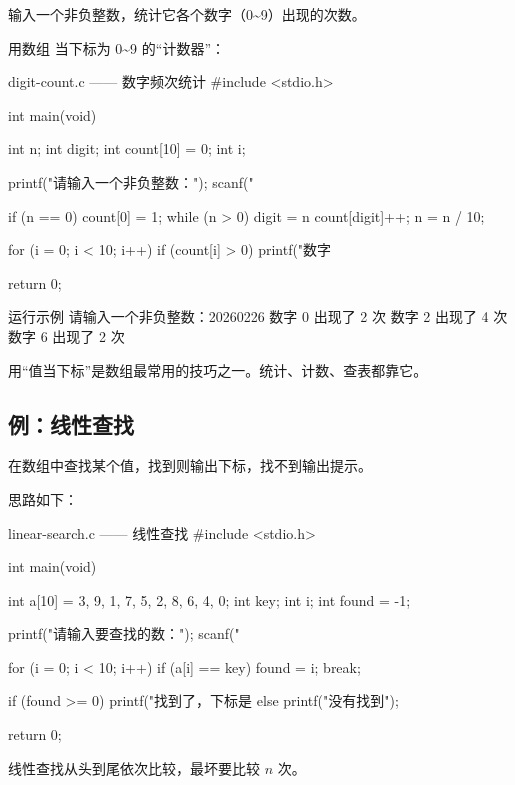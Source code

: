 \begin{example}
输入一个非负整数，统计它各个数字（0\textasciitilde9）出现的次数。
\end{example}
\begin{solution}
用数组  当下标为 0\textasciitilde9 的“计数器”：

\begin{codebox}{digit-count.c —— 数字频次统计}
#include <stdio.h>

int main(void)
{
    int n;
    int digit;
    int count[10] = {0};
    int i;

    printf("请输入一个非负整数：");
    scanf("%

    if (n == 0) {
        count[0] = 1;
    }
    while (n > 0) {
        digit = n %
        count[digit]++;
        n = n / 10;
    }

    for (i = 0; i < 10; i++) {
        if (count[i] > 0) {
            printf("数字 %
        }
    }

    return 0;
}
\end{codebox}

\begin{outbox}{运行示例}
请输入一个非负整数：20260226
数字 0 出现了 2 次
数字 2 出现了 4 次
数字 6 出现了 2 次
\end{outbox}

用“值当下标”是数组最常用的技巧之一。统计、计数、查表都靠它。
\end{solution}

\subsection{例：线性查找}

\begin{example}
在数组中查找某个值，找到则输出下标，找不到输出提示。
\end{example}
\begin{solution}
思路如下：

\begin{codebox}{linear-search.c —— 线性查找}
#include <stdio.h>

int main(void)
{
    int a[10] = {3, 9, 1, 7, 5, 2, 8, 6, 4, 0};
    int key;
    int i;
    int found = -1;

    printf("请输入要查找的数：");
    scanf("%

    for (i = 0; i < 10; i++) {
        if (a[i] == key) {
            found = i;
            break;
        }
    }

    if (found >= 0) {
        printf("找到了，下标是 %
    } else {
        printf("没有找到\n");
    }

    return 0;
}
\end{codebox}

线性查找从头到尾依次比较，最坏要比较 $n$ 次。
\end{solution}

